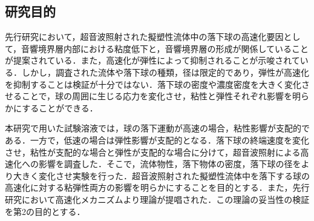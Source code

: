\subsection{研究目的}

先行研究\cite{ref:8}において，超音波照射された擬塑性流体中の落下球の高速化要因として，音響境界層内部における粘度低下と，音響境界層の形成が関係していることが提案されている．また，高速化が弾性によって抑制されることが示唆されている．しかし，調査された流体や落下球の種類，径は限定的であり，弾性が高速化を抑制することは検証が十分ではない．落下球の密度や濃度密度を大きく変化させることで，球の周囲に生じる応力を変化させ，粘性と弾性それぞれ影響を明らかにすることができる．

本研究で用いた試験溶液では，球の落下運動が高速の場合，粘性影響が支配的である．一方で，低速の場合は弾性影響が支配的となる．落下球の終端速度を変化させ，粘性が支配的な場合と弾性が支配的な場合に分けて，超音波照射による高速化への影響を調査した．そこで，流体物性，落下物体の密度，落下球の径をより大きく変化させ実験を行った．超音波照射された擬塑性流体中を落下する球の高速化に対する粘弾性両方の影響を明らかにすることを目的とする．また，先行研究\cite{ref:8}において高速化メカニズムより理論が提唱された．この理論の妥当性の検証を第2の目的とする．